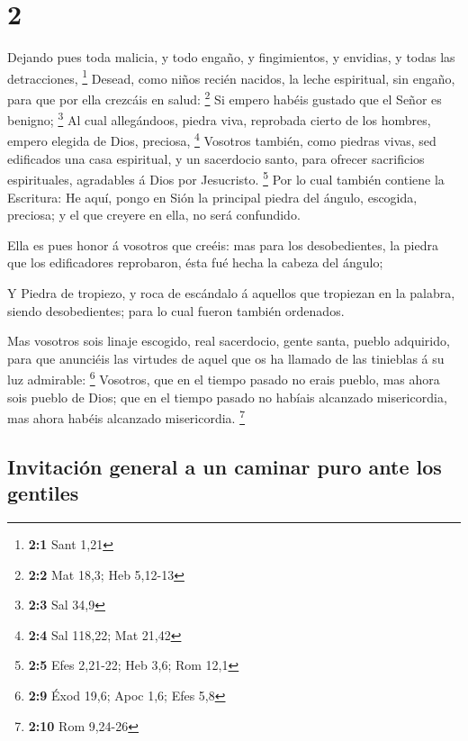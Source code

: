 \hypertarget{section-1}{%
\section{2}\label{section-1}}

 Dejando pues toda malicia, y todo engaño, y fingimientos,
y envidias, y todas las detracciones, \footnote{\textbf{2:1} Sant 1,21}
 Desead, como niños recién nacidos, la leche espiritual,
sin engaño, para que por ella crezcáis en salud: \footnote{\textbf{2:2}
  Mat 18,3; Heb 5,12-13}  Si empero habéis gustado que el
Señor es benigno; \footnote{\textbf{2:3} Sal 34,9}  Al
cual allegándoos, piedra viva, reprobada cierto de los hombres, empero
elegida de Dios, preciosa, \footnote{\textbf{2:4} Sal 118,22; Mat 21,42}
 Vosotros también, como piedras vivas, sed edificados una
casa espiritual, y un sacerdocio santo, para ofrecer sacrificios
espirituales, agradables á Dios por Jesucristo. \footnote{\textbf{2:5}
  Efes 2,21-22; Heb 3,6; Rom 12,1}  Por lo cual también
contiene la Escritura: He aquí, pongo en Sión la principal piedra del
ángulo, escogida, preciosa; y el que creyere en ella, no será
confundido.

 Ella es pues honor á vosotros que creéis: mas para los
desobedientes, la piedra que los edificadores reprobaron, ésta fué hecha
la cabeza del ángulo;

 Y Piedra de tropiezo, y roca de escándalo á aquellos que
tropiezan en la palabra, siendo desobedientes; para lo cual fueron
también ordenados.

 Mas vosotros sois linaje escogido, real sacerdocio, gente
santa, pueblo adquirido, para que anunciéis las virtudes de aquel que os
ha llamado de las tinieblas á su luz admirable: \footnote{\textbf{2:9}
  Éxod 19,6; Apoc 1,6; Efes 5,8}  Vosotros, que en el
tiempo pasado no erais pueblo, mas ahora sois pueblo de Dios; que en el
tiempo pasado no habíais alcanzado misericordia, mas ahora habéis
alcanzado misericordia. \footnote{\textbf{2:10} Rom 9,24-26}

\hypertarget{invitaciuxf3n-general-a-un-caminar-puro-ante-los-gentiles}{%
\subsection{Invitación general a un caminar puro ante los
gentiles}\label{invitaciuxf3n-general-a-un-caminar-puro-ante-los-gentiles}}

